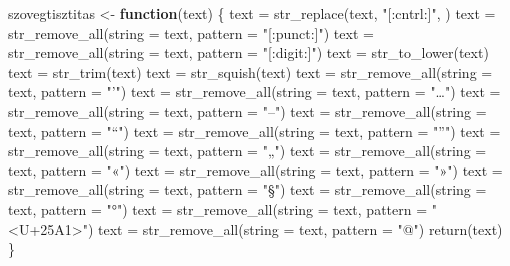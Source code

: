 \documentclass[
]{book}
\newenvironment{Shaded}{\begin{snugshade}}{\end{snugshade}}
\newcommand{\AttributeTok}[1]{\textcolor[rgb]{0.77,0.63,0.00}{#1}}
\newcommand{\ControlFlowTok}[1]{\textcolor[rgb]{0.13,0.29,0.53}{\textbf{#1}}}
\newcommand{\FunctionTok}[1]{\textcolor[rgb]{0.00,0.00,0.00}{#1}}
\newcommand{\NormalTok}[1]{#1}
\newcommand{\OtherTok}[1]{\textcolor[rgb]{0.56,0.35,0.01}{#1}}
\newcommand{\StringTok}[1]{\textcolor[rgb]{0.31,0.60,0.02}{#1}}
\begin{document}
\begin{Shaded}
\begin{Highlighting}[]

\NormalTok{szovegtisztitas }\OtherTok{\textless{}{-}} \ControlFlowTok{function}\NormalTok{(text) \{}
\NormalTok{  text }\OtherTok{=} \FunctionTok{str\_replace}\NormalTok{(text, }\StringTok{"[:cntrl:]"}\NormalTok{, }\StringTok{\textquotesingle{} \textquotesingle{}}\NormalTok{)}
\NormalTok{  text }\OtherTok{=} \FunctionTok{str\_remove\_all}\NormalTok{(}\AttributeTok{string =}\NormalTok{ text, }\AttributeTok{pattern =} \StringTok{"[:punct:]"}\NormalTok{)}
\NormalTok{  text }\OtherTok{=} \FunctionTok{str\_remove\_all}\NormalTok{(}\AttributeTok{string =}\NormalTok{ text, }\AttributeTok{pattern =} \StringTok{"[:digit:]"}\NormalTok{)}
\NormalTok{  text }\OtherTok{=} \FunctionTok{str\_to\_lower}\NormalTok{(text)}
\NormalTok{  text }\OtherTok{=} \FunctionTok{str\_trim}\NormalTok{(text)}
\NormalTok{  text }\OtherTok{=} \FunctionTok{str\_squish}\NormalTok{(text)}
\NormalTok{  text }\OtherTok{=} \FunctionTok{str\_remove\_all}\NormalTok{(}\AttributeTok{string =}\NormalTok{ text, }\AttributeTok{pattern =} \StringTok{"’"}\NormalTok{)}
\NormalTok{  text }\OtherTok{=} \FunctionTok{str\_remove\_all}\NormalTok{(}\AttributeTok{string =}\NormalTok{ text, }\AttributeTok{pattern =} \StringTok{"…"}\NormalTok{)}
\NormalTok{  text }\OtherTok{=} \FunctionTok{str\_remove\_all}\NormalTok{(}\AttributeTok{string =}\NormalTok{ text, }\AttributeTok{pattern =} \StringTok{"–"}\NormalTok{)}
\NormalTok{  text }\OtherTok{=} \FunctionTok{str\_remove\_all}\NormalTok{(}\AttributeTok{string =}\NormalTok{ text, }\AttributeTok{pattern =} \StringTok{"“"}\NormalTok{)}
\NormalTok{  text }\OtherTok{=} \FunctionTok{str\_remove\_all}\NormalTok{(}\AttributeTok{string =}\NormalTok{ text, }\AttributeTok{pattern =} \StringTok{"”"}\NormalTok{)}
\NormalTok{  text }\OtherTok{=} \FunctionTok{str\_remove\_all}\NormalTok{(}\AttributeTok{string =}\NormalTok{ text, }\AttributeTok{pattern =} \StringTok{"„"}\NormalTok{)}
\NormalTok{  text }\OtherTok{=} \FunctionTok{str\_remove\_all}\NormalTok{(}\AttributeTok{string =}\NormalTok{ text, }\AttributeTok{pattern =} \StringTok{"«"}\NormalTok{)}
\NormalTok{  text }\OtherTok{=} \FunctionTok{str\_remove\_all}\NormalTok{(}\AttributeTok{string =}\NormalTok{ text, }\AttributeTok{pattern =} \StringTok{"»"}\NormalTok{)}
\NormalTok{  text }\OtherTok{=} \FunctionTok{str\_remove\_all}\NormalTok{(}\AttributeTok{string =}\NormalTok{ text, }\AttributeTok{pattern =} \StringTok{"§"}\NormalTok{)}
\NormalTok{  text }\OtherTok{=} \FunctionTok{str\_remove\_all}\NormalTok{(}\AttributeTok{string =}\NormalTok{ text, }\AttributeTok{pattern =} \StringTok{"°"}\NormalTok{)}
\NormalTok{  text }\OtherTok{=} \FunctionTok{str\_remove\_all}\NormalTok{(}\AttributeTok{string =}\NormalTok{ text, }\AttributeTok{pattern =} \StringTok{"\textless{}U+25A1\textgreater{}"}\NormalTok{)}
\NormalTok{  text }\OtherTok{=} \FunctionTok{str\_remove\_all}\NormalTok{(}\AttributeTok{string =}\NormalTok{ text, }\AttributeTok{pattern =} \StringTok{"@"}\NormalTok{)}
  \FunctionTok{return}\NormalTok{(text)}
\NormalTok{\}}
\end{Highlighting}
\end{Shaded}
\end{document}
